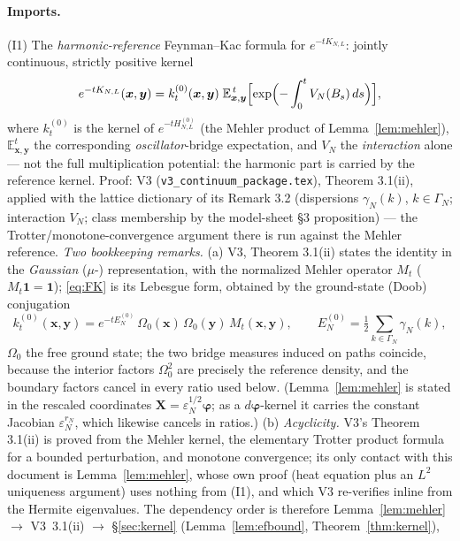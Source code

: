 \documentclass[11pt,a4paper]{article}
\theoremstyle{plain}
\theoremstyle{definition}
\newcommand{\E}{\mathbb{E}}
\newcommand{\eps}{\varepsilon}
\newcommand{\muv}{\mu}
\begin{document}
\paragraph{Imports.} (I1) The \emph{harmonic-reference} Feynman--Kac formula
for $e^{-tK_{N,L}}$: jointly continuous, strictly positive kernel
\begin{equation}
 e^{-tK_{N,L}}(\bm x,\bm y)
 =k^{(0)}_t(\bm x,\bm y)\;
 \E^{\,t}_{\bm x,\bm y}\Bigl[\exp\Bigl(-\int_0^tV_N(B_s)\,ds\Bigr)\Bigr],
 \label{eq:FK}
\end{equation}
where $k^{(0)}_t$ is the kernel of $e^{-tH^{(0)}_{N,L}}$ (the Mehler product
of Lemma~\ref{lem:mehler}), $\E^t_{\bm x,\bm y}$ the corresponding
\emph{oscillator}-bridge expectation, and $V_N$ the \emph{interaction} alone
--- not the full multiplication potential: the harmonic part is carried by the
reference kernel. Proof: V3 (\texttt{v3\_continuum\_package.tex}), Theorem
3.1(ii), applied with the lattice dictionary of its Remark 3.2 (dispersions
$\gamma_N(k)$, $k\in\Gamma_N$; interaction $V_N$; class membership by the
model-sheet \S3 proposition) --- the Trotter/monotone-convergence argument
there is run against the Mehler reference. \emph{Two bookkeeping remarks.}
(a) V3, Theorem 3.1(ii) states the identity in the \emph{Gaussian}
($\muv$-) representation, with the normalized Mehler operator
$M_t$ ($M_t\mathbf 1=\mathbf 1$); \eqref{eq:FK} is its Lebesgue form, obtained
by the ground-state (Doob) conjugation
\[
 k^{(0)}_t(\bm x,\bm y)
 =e^{-tE^{(0)}_N}\,\Omega_0(\bm x)\,\Omega_0(\bm y)\,M_t(\bm x,\bm y),
 \qquad E^{(0)}_N=\tfrac12\sum_{k\in\Gamma_N}\gamma_N(k),
\]
$\Omega_0$ the free ground state; the two bridge measures induced on paths
coincide, because the interior factors $\Omega_0^2$ are precisely the
reference density, and the boundary factors cancel in every ratio used below.
(Lemma~\ref{lem:mehler} is stated in the rescaled coordinates
$\bm X=\eps_N^{1/2}\bm\varphi$; as a $d\bm\varphi$-kernel it carries the
constant Jacobian $\eps_N^{r_N}$, which likewise cancels in ratios.)
(b) \emph{Acyclicity.} V3's Theorem 3.1(ii) is proved from the Mehler kernel,
the elementary Trotter product formula for a bounded perturbation, and
monotone convergence; its only contact with this document is
Lemma~\ref{lem:mehler}, whose own proof (heat equation plus an $L^2$
uniqueness argument) uses nothing from (I1), and which V3 re-verifies inline
from the Hermite eigenvalues. The dependency order is therefore
Lemma~\ref{lem:mehler} $\to$ V3~3.1(ii) $\to$
\S\ref{sec:kernel} (Lemma~\ref{lem:efbound}, Theorem~\ref{thm:kernel}),
\end{document}
